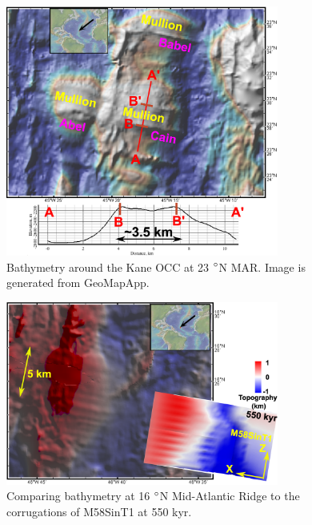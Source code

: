 \documentclass[draft,gc]{agutex}
\begin{document}
\begin{figure}[h]
\noindent\includegraphics[width=0.8\textwidth]{./Figures/fig_Discussion_Observation_5_Mullion_Kane.eps}
  \caption[Bathymetry around the Kane OCC at 23 $\degree$N MAR.]{Bathymetry around the Kane OCC at 23 $\degree$N MAR. Image is generated from GeoMapApp.}
 \label{fig_Discussion_Observation_5_Mullion_Kane}
\end{figure}   

\begin{figure}[h]
\noindent\includegraphics[width=0.8\textwidth]{./Figures/TOBE_USED_fig_Discussion_Observation_Corrugations_16N_MAR.eps}
  \caption{Comparing bathymetry at 16 $\degree$N Mid-Atlantic Ridge to the corrugations of M58SinT1 at 550 kyr.}
 \label{fig_Discussion_Observation_Corrugations16N_M58SinT1}
\end{figure}
\end{document}
